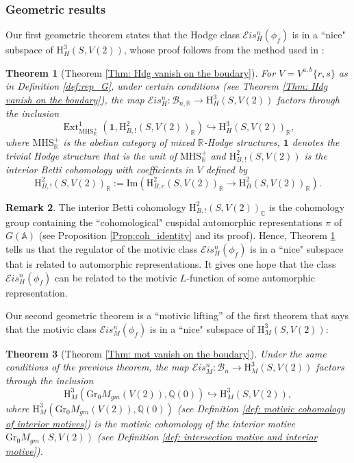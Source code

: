 \documentclass[11pt, a4paper]{amsart}
\theoremstyle{plain}
\newtheorem{theorem}{Theorem}[section]
\theoremstyle{definition}
\newtheorem{remark}[theorem]{Remark}
\numberwithin{equation}{section}
\def\AAA{\mathbb{A}}
\def\CC{\mathbb{C}}
\def\QQ{\mathbb{Q}}
\def\RR{\mathbb{R}}
\DeclareMathOperator{\Ext}{Ext}
\begin{document}
\subsubsection{Geometric results}
Our first geometric theorem states that the Hodge class $\mathcal{E}is^{n}_{H}(\phi_f)$ is in a ``nice" subspace of $\mathrm{H}^{3}_{H}(S,V(2))$, whose proof follows from the method used in \cite{LemmaI15}: 
\begin{theorem}[Theorem \ref{Thm: Hdg vanish on the boudary}]
\label{Thm: intro_Hodge_vanish_on_the_boundary}
For $V = V^{a, b}\{r, s\}$ as in Definition \ref{def:rep_G}, under certain conditions (see Theorem \ref{Thm: Hdg vanish on the boudary}), 
the map $\mathcal{E}is_{H}^n\colon \mathcal{B}_{n,\RR} \rightarrow \mathrm{H}^{3}_{H}(S, V(2))$ factors through the inclusion 
\[
    \Ext^{1}_{\mathrm{MHS}_{\RR}^{+}}(\mathbf{1}, \mathrm{H}^{2}_{B,!}(S, V(2))_{\RR}) \hookrightarrow \mathrm{H}^{3}_{H}(S, V(2))_{\RR}, 
\]
where $\mathrm{MHS}_{\RR}^{+}$ is the abelian category of mixed $\RR$-Hodge structures, ${\mathbf{1}}$ denotes the trivial Hodge structure that is the unit of $\mathrm{MHS}_{\RR}^{+}$ and $\mathrm{H}^{2}_{B,!}(S, V(2))$ is the interior Betti cohomology with coefficients in $V$ defined by
\begin{equation*}
    \mathrm{H}^{2}_{B,!}(S, V(2))_{\RR} := \mathrm{Im}(\mathrm{H}^{2}_{B,c}(S, V(2))_{\RR} \rightarrow \mathrm{H}^{2}_{B}(S, V(2))_{\RR}). 
\end{equation*}
\end{theorem}

\begin{remark}
    The interior Betti cohomology $\mathrm{H}^{2}_{B,!}(S, V(2))_{\CC}$ is the cohomology group containing the ``cohomological" cuspidal automorphic representations $\pi$ of $G(\AAA)$ (see Proposition \ref{Prop:coh_identity} and its proof). Hence, Theorem \ref{Thm: intro_Hodge_vanish_on_the_boundary} tells us that the regulator of the motivic class $\mathcal{E}is^{n}_{H}(\phi_f)$ is in a ``nice" subspace that is related to automorphic representations. It gives one hope that the class $\mathcal{E}is^{n}_{H}(\phi_f)$ can be related to the motivic $L$-function of some automorphic representation. 
\end{remark}

Our second geometric theorem is a ``motivic lifting'' of the first theorem that says that the motivic class $\mathcal{E}is^{n}_{M}(\phi_f)$ is in a ``nice" subspace of $\mathrm{H}^{3}_{M}(S,V(2))$: 
\begin{theorem}[Theorem \ref{Thm: mot vanish on the boudary}]
\label{Thm: intro_motivic_vanish_on_the_boundary}
Under the same conditions of the previous theorem, 
the map $\mathcal{E}is_{M}^n \colon \mathcal{B}_{n} \rightarrow \mathrm{H}^{3}_{M}(S, V(2))$ factors through the inclusion 
\[
    \mathrm{H}_{M}^{3}(\mathrm{Gr_{0}}M_{gm}(V(2)), \QQ(0)) \hookrightarrow \mathrm{H}^{3}_{M}(S, V(2)), 
\] 
where $\mathrm{H}_{M}^{3}(\mathrm{Gr_{0}}M_{gm}(V(2)), \QQ(0))$ (see Definition \ref{def: motivic cohomology of interior motives}) is the motivic cohomology of the interior motive $\mathrm{Gr_{0}}M_{gm}(S, V(2))$ (see Definition \ref{def: intersection motive and interior motive}).  
\end{theorem}
\end{document}
